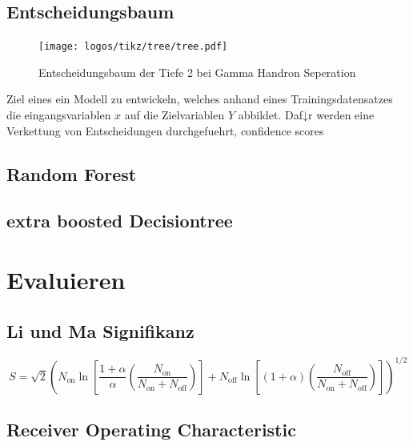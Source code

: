 \subsection{Entscheidungsbaum}
\begin{figure}
  \centering
  \texttt{[image: logos/tikz/tree/tree.pdf]}
  \caption{Entscheidungsbaum der Tiefe 2 bei Gamma Handron Seperation}
\end{figure}
Ziel eines ein Modell zu entwickeln, welches anhand eines Trainingsdatensatzes die eingangsvariablen $x$ auf die Zielvariablen $Y$ abbildet. Daf↓r werden eine Verkettung von Entscheidungen durchgefuehrt,  
confidence scores
\subsection{Random Forest}

\subsection{extra boosted Decisiontree}

\section{Evaluieren}

\subsection{Li und Ma Signifikanz}

\begin{equation}
S = \sqrt{2} \left( N_\text{on} \ln \left[ \frac{1+ \alpha}{\alpha}\left( \frac{N_\text{on}}{N_\text{on} + N_\text{off}} \right) \right] + N_\text{off} \ln \left[ \left( 1+ \alpha \right) \left( \frac{N_\text{off}}{N_\text{on} + N_\text{off}} \right) \right] \right)^{1/2}
\end{equation}
\subsection{Receiver Operating Characteristic}

